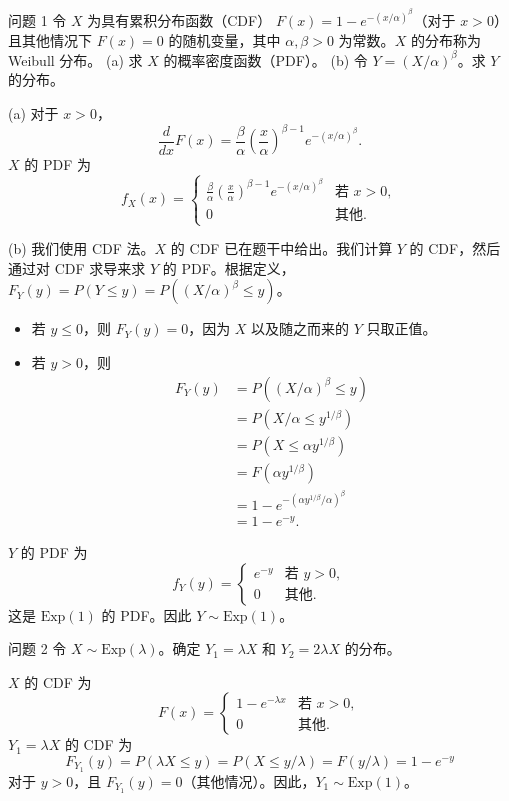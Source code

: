 \begin{questions}
\question 问题 1 令 $X$ 为具有累积分布函数（CDF） $F(x) = 1 - e^{-(x/\alpha)^\beta}$（对于 $x > 0$）且其他情况下 $F(x) = 0$ 的随机变量，其中 $\alpha, \beta > 0$ 为常数。$X$ 的分布称为 Weibull 分布。
(a) 求 $X$ 的概率密度函数（PDF）。
(b) 令 $Y = (X/\alpha)^\beta$。求 $Y$ 的分布。

\begin{solution}
(a) 对于 $x > 0$，
\[
\frac{d}{dx} F(x) = \frac{\beta}{\alpha} \left( \frac{x}{\alpha} \right)^{\beta-1} e^{-(x/\alpha)^\beta}.
\]
$X$ 的 PDF 为
\[
f_X(x) = \begin{cases} \frac{\beta}{\alpha} \left( \frac{x}{\alpha} \right)^{\beta-1} e^{-(x/\alpha)^\beta} & \text{若 } x > 0, \\ 0 & \text{其他}. \end{cases}
\]

(b) 我们使用 CDF 法。$X$ 的 CDF 已在题干中给出。我们计算 $Y$ 的 CDF，然后通过对 CDF 求导来求 $Y$ 的 PDF。根据定义，$F_Y(y) = P(Y \le y) = P((X/\alpha)^\beta \le y)$。
\begin{itemize}
    \item 若 $y \le 0$，则 $F_Y(y) = 0$，因为 $X$ 以及随之而来的 $Y$ 只取正值。
    \item 若 $y > 0$，则
    \begin{align*}
    F_Y(y) &= P((X/\alpha)^\beta \le y) \\
    &= P(X/\alpha \le y^{1/\beta}) \\
    &= P(X \le \alpha y^{1/\beta}) \\
    &= F(\alpha y^{1/\beta}) \\
    &= 1 - e^{-(\alpha y^{1/\beta}/\alpha)^\beta} \\
    &= 1 - e^{-y}.
    \end{align*}
\end{itemize}
$Y$ 的 PDF 为
\[
f_Y(y) = \begin{cases} e^{-y} & \text{若 } y > 0, \\ 0 & \text{其他}. \end{cases}
\]
这是 $\text{Exp}(1)$ 的 PDF。因此 $Y \sim \text{Exp}(1)$。
\end{solution}

\question 问题 2 令 $X \sim \text{Exp}(\lambda)$。确定 $Y_1 = \lambda X$ 和 $Y_2 = 2\lambda X$ 的分布。

\begin{solution}
$X$ 的 CDF 为
\[
F(x) = \begin{cases} 1 - e^{-\lambda x} & \text{若 } x > 0, \\ 0 & \text{其他}. \end{cases}
\]
$Y_1 = \lambda X$ 的 CDF 为
\[
F_{Y_1}(y) = P(\lambda X \le y) = P(X \le y/\lambda) = F(y/\lambda) = 1 - e^{-y}
\]
对于 $y > 0$，且 $F_{Y_1}(y) = 0$（其他情况）。因此，$Y_1 \sim \text{Exp}(1)$。


\end{solution}
\end{questions}
